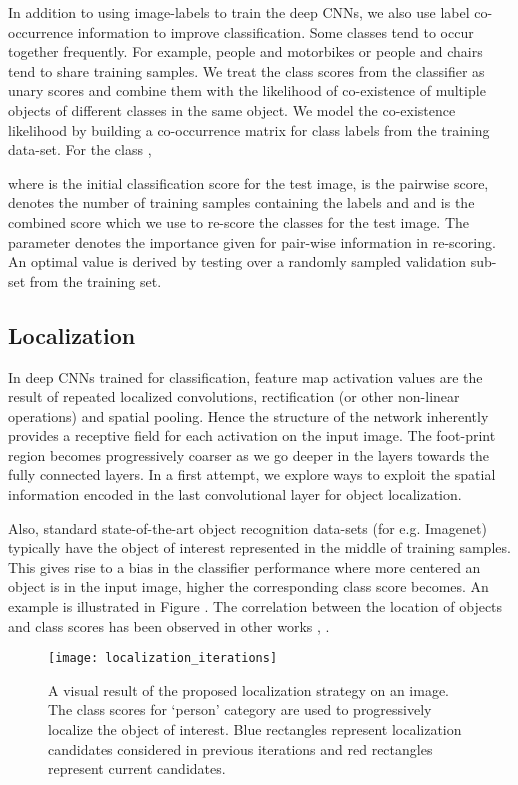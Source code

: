 \documentclass[runningheads]{llncs}
\begin{document}
In addition to using image-labels to train the deep CNNs, we also use label co-occurrence information to improve classification. Some classes tend to occur together frequently. For example, people and motorbikes or people and chairs tend to share training samples. We treat the class scores from the classifier as unary scores and combine them with the likelihood of co-existence of multiple objects of different classes in the same object. We model the co-existence likelihood by building a co-occurrence matrix for class labels from the training data-set.  For the class ,



\noindent where  is the initial classification score for the test image,  is the pairwise score,  denotes the number of training samples containing the labels  and  and  is the combined score which we use to re-score the classes for the test image. The parameter  denotes the importance given for pair-wise information in re-scoring. An optimal value is derived by testing over a randomly sampled validation sub-set from the training set.

\subsection{Localization}


In deep CNNs trained for classification, feature map activation values are the result of repeated localized convolutions, rectification (or other non-linear operations) and spatial pooling. Hence the structure of the network inherently provides a receptive field for each activation on the input image. The foot-print region becomes progressively coarser as we go deeper in the layers towards the fully connected layers. In a first attempt, we explore ways to exploit the spatial information encoded in the last convolutional layer for object localization.

Also, standard state-of-the-art object recognition data-sets (for e.g. Imagenet) typically have the object of interest represented in the middle of training samples. This gives rise to a bias in the classifier performance where more centered an object is in the input image, higher the corresponding class score becomes. An example is illustrated in Figure .  The correlation between the location of objects and class scores has been observed in other works \cite{Oquab14}, \cite{girshick2014rich}.

\begin{figure*}
\begin{center}
\texttt{[image: localization\_iterations]}
\end{center}
   \caption{A visual result of the proposed localization strategy on an image. The class scores for `person' category are used to progressively localize the object of interest. Blue rectangles represent localization candidates considered in previous iterations and red rectangles represent current candidates.}
\label{fig:localization_iterations}
\end{figure*}
\end{document}
